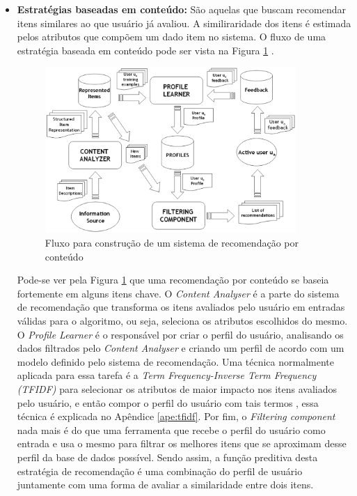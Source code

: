 \begin{itemize}
    \item \textbf{Estratégias baseadas em conteúdo: } São aquelas que buscam
        recomendar itens similares ao que usuário já avaliou. A similiraridade
        dos itens é estimada pelos atributos que compõem um dado item no
        sistema. O fluxo de uma estratégia baseada em conteúdo pode ser vista na
        Figura \ref{fig:recomendacao_conteudo} \cite{lops2011content}.

        \begin{figure}[h]
            \centering
            \includegraphics[width=0.9\textwidth]{figuras/recomendacao_conteudo}
            \caption{Fluxo para construção de um sistema de recomendação por
            conteúdo}
            \label{fig:recomendacao_conteudo}
        \end{figure}

        Pode-se ver pela Figura \ref{fig:recomendacao_conteudo} que uma recomendação
        por conteúdo se baseia fortemente em alguns itens chave. O
        \textit{Content Analyser} é a parte do sistema de recomendação que
        transforma os itens avaliados pelo usuário em entradas válidas para o
        algoritmo, ou seja, seleciona os atributos escolhidos do mesmo. O
        \textit{Profile Learner} é o responsável por criar o perfil do
        usuário, analisando os dados filtrados pelo \textit{Content Analyser} e
        criando um perfil de acordo com um modelo definido pelo sistema de
        recomendação. Uma técnica normalmente aplicada para essa tarefa é a
        \textit{Term Frequency-Inverse Term Frequency (TFIDF)} para selecionar
        os atributos de maior impacto nos itens avaliados pelo usuário, e então
        compor o perfil do usuário com tais termos \cite{lops2011content},
        essa técnica é explicada no Apêndice \ref{ape:tfidf}.  Por fim, o
        \textit{Filtering component} nada mais é do que uma ferramenta que recebe
        o perfil do usuário como entrada e usa o mesmo para filtrar os melhores
        itens que se aproximam desse perfil da base de dados possível. Sendo assim,
        a função preditiva desta estratégia de recomendação é uma combinação do
        perfil de usuário juntamente com uma forma de avaliar a similaridade entre
        dois itens.


\end{itemize}
